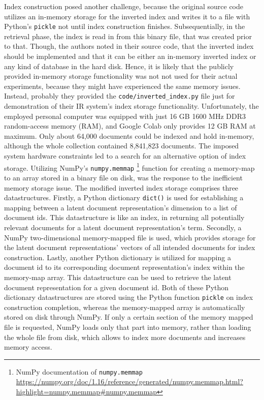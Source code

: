Index construction posed another challenge, because the original source code utilizes an in-memory storage
    for the inverted index and writes it to a file with Python's \texttt{pickle} not until index construction finishes.
Subsequentially, in the retrieval phase, the index is read in from this binary file, that was created prior to that.
Though, the authors noted in their source code, that the inverted index should be implemented and that it can be 
    either an in-memory inverted index or any kind of database in the hard disk.
Hence, it is likely that the publicly provided in-memory storage functionality was not not used for their actual experiments,
    because they might have experienced the same memory issues.
Instead, probably they provided the \verb|code/inverted_index.py| file just for demonstration of their IR system's index
    storage functionality.
Unfortunately, the employed personal computer was equipped with just 16 GB 1600 MHz DDR3 random-access memory (RAM),
    and Google Colab only provides 12 GB RAM at maximum.
Only about 64,000 documents could be indexed and hold in-memory, although the whole collection contained 8,841,823 documents.
The imposed system hardware constraints led to a search for an alternative option of index storage.
Utilizing NumPy's \texttt{numpy.memmap}
    \footnote{NumPy documentation of \texttt{numpy.memmap} \url{https://numpy.org/doc/1.16/reference/generated/numpy.memmap.html?highlight=numpy.memmap\#numpy.memmap}} 
    function for creating a memory-map to an array stored in a binary file on disk, was the response to the 
    inefficient memory storage issue.
The modified inverted index storage comprises three datastructures.
Firstly, a Python dictionary \texttt{dict()} is used for establishing a mapping between a latent document representation's dimension
    to a list of document ids.
This datastructure is like an index, in returning all potentially relevant documents for a latent document representation's term.
Secondly, a NumPy two-dimensional memory-mapped file is used, which provides storage for the latent document representations' vectors
    of all intended documents for index construction.
Lastly, another Python dictionary is utilized for mapping a document id to its corresponding document representation's index within 
    the memory-map array.
This datastructure can be used to retrieve the latent document representation for a given document id.
Both of these Python dictionary datastructures are stored using the Python function \texttt{pickle} on index construction completion,
    whereas the memory-mapped array is automatically stored on disk through NumPy.
If only a certain section of the memory mapped file is requested, NumPy loads only that part into memory, rather than loading the 
    whole file from disk, which allows to index more documents and increases memory access.

